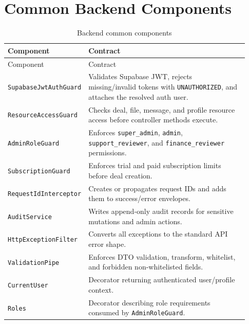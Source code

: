 \section*{Common Backend Components}
\begin{longtable}{p{0.25\linewidth}p{0.68\linewidth}}
\caption{Backend common components}\\
\toprule
Component & Contract \\
\midrule
\endfirsthead
\toprule
Component & Contract \\
\midrule
\endhead
\texttt{SupabaseJwtAuthGuard} & Validates Supabase JWT, rejects missing/invalid tokens with \texttt{UNAUTHORIZED}, and attaches the resolved auth user. \\
\texttt{ResourceAccessGuard} & Checks deal, file, message, and profile resource access before controller methods execute. \\
\texttt{AdminRoleGuard} & Enforces \texttt{super\_admin}, \texttt{admin}, \texttt{support\_reviewer}, and \texttt{finance\_reviewer} permissions. \\
\texttt{SubscriptionGuard} & Enforces trial and paid subscription limits before deal creation. \\
\texttt{RequestIdInterceptor} & Creates or propagates request IDs and adds them to success/error envelopes. \\
\texttt{AuditService} & Writes append-only audit records for sensitive mutations and admin actions. \\
\texttt{HttpExceptionFilter} & Converts all exceptions to the standard API error shape. \\
\texttt{ValidationPipe} & Enforces DTO validation, transform, whitelist, and forbidden non-whitelisted fields. \\
\texttt{CurrentUser} & Decorator returning authenticated user/profile context. \\
\texttt{Roles} & Decorator describing role requirements consumed by \texttt{AdminRoleGuard}. \\
\bottomrule
\end{longtable}


